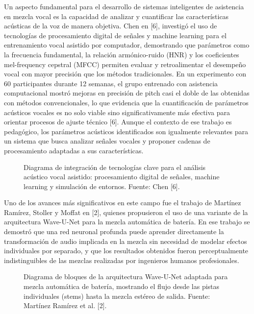 \documentclass[12pt]{article}
\begin{document}
Un aspecto fundamental para el desarrollo de sistemas inteligentes de asistencia en mezcla vocal es la capacidad de analizar y cuantificar las características acústicas de la voz de manera objetiva. Chen en [6], investigó el uso de tecnologías de procesamiento digital de señales y machine learning para el entrenamiento vocal asistido por computador, demostrando que parámetros como la frecuencia fundamental, la relación armónico-ruido (HNR) y los coeficientes mel-frequency cepstral (MFCC) permiten evaluar y retroalimentar el desempeño vocal con mayor precisión que los métodos tradicionales. En un experimento con 60 participantes durante 12 semanas, el grupo entrenado con asistencia computacional mostró mejoras en precisión de pitch casi el doble de las obtenidas con métodos convencionales, lo que evidencia que la cuantificación de parámetros acústicos vocales es no solo viable sino significativamente más efectiva para orientar procesos de ajuste técnico [6]. Aunque el contexto de ese trabajo es pedagógico, los parámetros acústicos identificados son igualmente relevantes para un sistema que busca analizar señales vocales y proponer cadenas de procesamiento adaptadas a sus características.

\begin{figure}[h!]
\centering
\caption{Diagrama de integración de tecnologías clave para el análisis acústico vocal asistido: procesamiento digital de señales, machine learning y simulación de entornos. Fuente: Chen [6].}
\label{fig:fig2}
\end{figure}

Uno de los avances más significativos en este campo fue el trabajo de Martínez Ramírez, Stoller y Moffat en [2], quienes propusieron el uso de una variante de la arquitectura Wave-U-Net para la mezcla automática de batería. En ese trabajo se demostró que una red neuronal profunda puede aprender directamente la transformación de audio implicada en la mezcla sin necesidad de modelar efectos individuales por separado, y que los resultados obtenidos fueron perceptualmente indistinguibles de las mezclas realizadas por ingenieros humanos profesionales.

\begin{figure}[h!]
\centering
\caption{Diagrama de bloques de la arquitectura Wave-U-Net adaptada para mezcla automática de batería, mostrando el flujo desde las pistas individuales (stems) hasta la mezcla estéreo de salida. Fuente: Martínez Ramírez et al. [2].}
\label{fig:fig3}
\end{figure}
\end{document}
